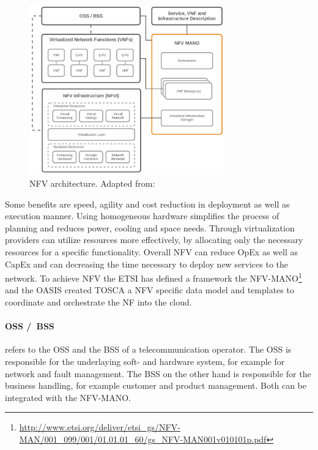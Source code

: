 \begin{figure}[H]
    \centering
    \includegraphics[width=0.75\textwidth]{resources/images/nfv_architecture.png}
    \caption[NFV architecture]{NFV architecture. Adapted from: \autocite{NFV:Architecture}}
    \label{fig:nfv_architecture}
\end{figure}

Some benefits are speed, agility and cost reduction in deployment as well as execution manner.\autocite[cf.]{Noble:2015}
Using homogeneous hardware simplifies the process of planning and reduces power, cooling and space needs.\autocite[cf.]{Noble:2015}
Through virtualization providers can utilize resources more effectively, by allocating only the necessary resources for a specific functionality.\autocite[cf.]{Noble:2015}
Overall \ac{NFV} can reduce \ac{OpEx} as well as \ac{CapEx} and can decreasing the time necessary to deploy new services to the network.\autocite[cf.]{Noble:2015}
To achieve \ac{NFV} the \ac{ETSI} has defined a framework the \ac{NFV-MANO}\footnote{\url{http://www.etsi.org/deliver/etsi_gs/NFV-MAN/001_099/001/01.01.01_60/gs_NFV-MAN001v010101p.pdf}} and the \ac{OASIS} created \ac{TOSCA} a \ac{NFV} specific data model and templates to coordinate and orchestrate the \ac{NF} into the cloud.

\paragraph{\acs{OSS} /\ \acs{BSS}} refers to the \ac{OSS} and the \ac{BSS} of a telecommunication operator.\autocite[cf.]{Kahn:2015}
The \ac{OSS} is responsible for the underlaying soft- and hardware system, for example for network and fault management.
The \ac{BSS} on the other hand is responsible for the business handling, for example customer and product management.
Both can be integrated with the \ac{NFV-MANO}.\autocite[cf.]{Kahn:2015}

